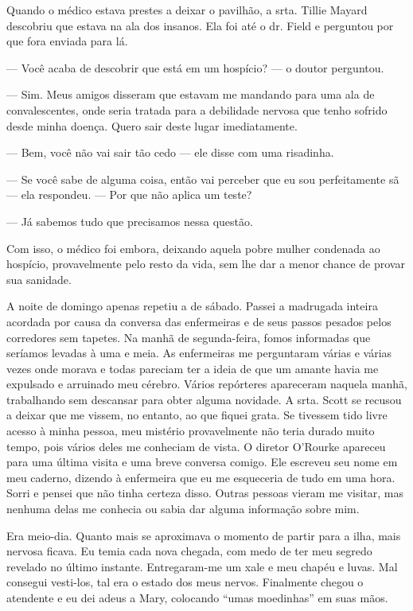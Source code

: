 Quando o médico estava prestes a deixar o pavilhão, a srta. Tillie
Mayard descobriu que estava na ala dos insanos. Ela foi até o dr. Field
e perguntou por que fora enviada para lá.

--- Você acaba de descobrir que está em um hospício? --- o doutor
perguntou.

--- Sim. Meus amigos disseram que estavam me mandando para uma ala de
convalescentes, onde seria tratada para a debilidade nervosa que tenho
sofrido desde minha doença. Quero sair deste lugar imediatamente.

--- Bem, você não vai sair tão cedo --- ele disse com uma risadinha.

--- Se você sabe de alguma coisa, então vai perceber que eu sou
perfeitamente sã --- ela respondeu. --- Por que não aplica um teste?

--- Já sabemos tudo que precisamos nessa questão. 

Com isso, o médico
foi embora, deixando aquela pobre mulher condenada ao hospício,
provavelmente pelo resto da vida, sem lhe dar a menor chance de provar
sua sanidade.

A noite de domingo apenas repetiu a de sábado. Passei a madrugada
inteira acordada por causa da conversa das enfermeiras e de seus passos
pesados pelos corredores sem tapetes. Na manhã de segunda-feira, fomos
informadas que seríamos levadas à uma e meia. As enfermeiras me
perguntaram várias e várias vezes onde morava e todas pareciam ter a
ideia de que um amante havia me expulsado e arruinado meu cérebro.
Vários repórteres apareceram naquela manhã, trabalhando sem descansar
para obter alguma novidade. A srta. Scott se recusou a deixar que me
vissem, no entanto, ao que fiquei grata. Se tivessem tido livre acesso à
minha pessoa, meu mistério provavelmente não teria durado muito tempo,
pois vários deles me conheciam de vista. O diretor O'Rourke apareceu
para uma última visita e uma breve conversa comigo. Ele escreveu seu
nome em meu caderno, dizendo à enfermeira que eu me esqueceria de tudo
em uma hora. Sorri e pensei que não tinha certeza disso. Outras pessoas
vieram me visitar, mas nenhuma delas me conhecia ou sabia dar alguma
informação sobre mim.

Era meio-dia. Quanto mais se aproximava o momento de partir para a ilha,
mais nervosa ficava. Eu temia cada nova chegada, com medo de ter meu
segredo revelado no último instante. Entregaram-me um xale e meu chapéu
e luvas. Mal consegui vesti-los, tal era o estado dos meus nervos.
Finalmente chegou o atendente e eu dei adeus a Mary, colocando ``umas
moedinhas'' em suas mãos. 

